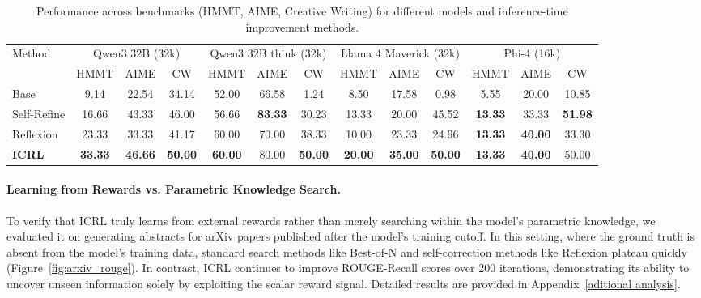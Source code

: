 \documentclass{article}
\newcommand{\0}{\mathbf{0}}
\begin{document}
\begin{table}[t]
  \centering
  \small
  \setlength{\tabcolsep}{2.5pt}
  \renewcommand{\arraystretch}{1.3}
  \caption{Performance across benchmarks (HMMT, AIME, Creative Writing) for different models and inference-time improvement methods.}
  \label{tab:icrl_results}
  \begin{tabular}{@{}l|ccc|ccc|ccc|ccc@{}}
    \toprule
    \multirow{2}{*}{Method} &
    \multicolumn{3}{c|}{Qwen3 32B (32k)} &
    \multicolumn{3}{c|}{Qwen3 32B think (32k)} &
    \multicolumn{3}{c|}{Llama 4 Maverick (32k)} &
    \multicolumn{3}{c}{Phi-4 (16k)} \\
    \cmidrule(lr){2-4}\cmidrule(lr){5-7}\cmidrule(lr){8-10}\cmidrule(lr){11-13}
    & HMMT & AIME & CW & HMMT & AIME & CW & HMMT & AIME & CW & HMMT & AIME & CW \\
    \midrule
    Base        & 9.14  & 22.54  & 34.14  & 52.00  & 66.58  & 1.24   & 8.50  & 17.58  & 0.98   & 5.55  & 20.00  & 10.85 \\
    Self-Refine & 16.66 & 43.33  & 46.00  & 56.66  & \textbf{83.33}  & 30.23  & 13.33 & 20.00  & 45.52  & \textbf{13.33} & 33.33  & \textbf{51.98} \\
    Reflexion   & 23.33 & 33.33  & 41.17  & 60.00  & 70.00  & 38.33  & 10.00 & 23.33  & 24.96  & \textbf{13.33} & \textbf{40.00}  & 33.30 \\
    \textbf{ICRL} & \textbf{33.33} & \textbf{46.66} & \textbf{50.00} &
    \textbf{60.00} & 80.00 & \textbf{50.00} &
    \textbf{20.00} & \textbf{35.00} & \textbf{50.00} &
    \textbf{13.33} & \textbf{40.00} & 50.00 \\
    \bottomrule
  \end{tabular}
\end{table}
\vspace{-.25cm}
\newpage
\paragraph{Learning from Rewards vs. Parametric Knowledge Search.}
To verify that ICRL truly learns from external rewards rather than merely searching within the model's parametric knowledge, we evaluated it on generating abstracts for arXiv papers published after the model's training cutoff. In this setting, where the ground truth is absent from the model's training data, standard search methods like Best-of-N and self-correction methods like Reflexion plateau quickly (Figure~\ref{fig:arxiv_rouge}). In contrast, ICRL continues to improve ROUGE-Recall scores over 200 iterations, demonstrating its ability to uncover unseen information solely by exploiting the scalar reward signal. Detailed results are provided in Appendix~\ref{aditional analysis}.
\end{document}
